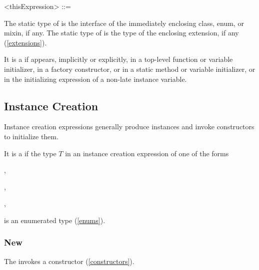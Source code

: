 \documentclass[makeidx]{article}
\begin{document}
{\begin{grammar}
<thisExpression> ::= \THIS{}
\end{grammar}

\LMHash{}%
The static type of \THIS{} is the interface of the
immediately enclosing class, enum, or mixin, if any.
The static type of \THIS{} is
the \ON{} type of the enclosing extension, if any
(\ref{extensions}).


\LMHash{}%
It is a  if \THIS{} appears, implicitly or explicitly,
in a top-level function or variable initializer, in a factory constructor,
or in a static method or variable initializer,
or in the initializing expression of a non-late instance variable.


\subsection{Instance Creation}

\LMHash{}%
Instance creation expressions generally produce instances
and invoke constructors to initialize them.


\LMHash{}%
It is a  if
the type $T$ in an instance creation expression of one of the forms

\noindent
{},

\noindent
{},

\noindent
{},

\noindent
{}

\noindent
is an enumerated type (\ref{enums}).


\subsubsection{New}

\LMHash{}%
The  invokes a constructor (\ref{constructors}).

}
\end{document}

